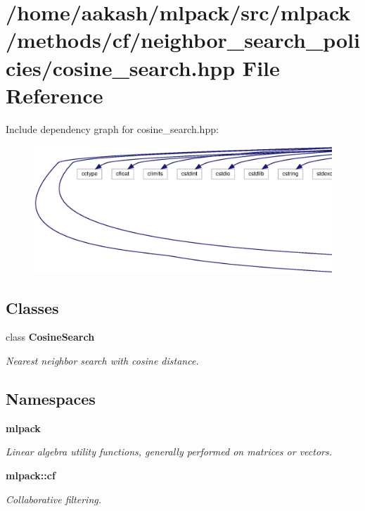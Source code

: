 \section{/home/aakash/mlpack/src/mlpack/methods/cf/neighbor\+\_\+search\+\_\+policies/cosine\+\_\+search.hpp File Reference}
\label{cosine__search_8hpp}
Include dependency graph for cosine\+\_\+search.\+hpp\+:
\nopagebreak
\begin{figure}[H]
\begin{center}
\leavevmode
\includegraphics[width=350pt]{cosine__search_8hpp__incl}
\end{center}
\end{figure}
\subsection*{Classes}
\begin{DoxyCompactItemize}
\item 
class \textbf{ Cosine\+Search}
\begin{DoxyCompactList}\small\item\em Nearest neighbor search with cosine distance. \end{DoxyCompactList}\end{DoxyCompactItemize}
\subsection*{Namespaces}
\begin{DoxyCompactItemize}
\item 
 \textbf{ mlpack}
\begin{DoxyCompactList}\small\item\em Linear algebra utility functions, generally performed on matrices or vectors. \end{DoxyCompactList}\item 
 \textbf{ mlpack\+::cf}
\begin{DoxyCompactList}\small\item\em Collaborative filtering. \end{DoxyCompactList}\end{DoxyCompactItemize}


